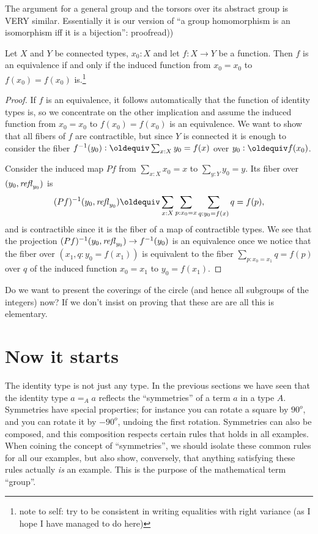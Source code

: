 \begin{definition}
The argument for a general group and the torsors over its abstract group is VERY similar.  Essentially it is our version of ``a group homomorphism is an isomorphism iff it is a bijection'': proofread))
\begin{lemma}
  Let $X$ and $Y$ be connected types, $x_0:X$ and let $f:X\to Y$ be a function.  Then $f$ is an equivalence if and only if the induced function from $x_0=x_0$ to $f(x_0)=f(x_0)$ is.\footnote{note to self: try to be consistent in writing equalities with right variance (as I hope I have managed to do here)}
\end{lemma}
\begin{proof}
  If $f$ is an equivalence, it follows automatically that the function of identity types is, so we concentrate on the other implication and assume the induced function from $x_0=x_0$ to $f(x_0)=f(x_0)$ is an equivalence.  We want to show that all fibers of $f$ are contractible, but since $Y$ is connected it is enough to consider the fiber $f^{-1}(y_0)\defequi\sum_{x:X}y_0=f(x)$ over $y_0\defequi f(x_0)$.  

Consider the induced map $Pf$ from $\sum_{x:X}x_0=x$ to $\sum_{y:Y}y_0=y$.  Its fiber over $(y_0,\mathop{{\it refl}_{y_0}})$ is 
$$(Pf)^{-1}(y_0,\refl{y_0})\oldequiv\sum_{x:X}\sum_{p:x_0=x}\sum_{q:y_0=f(x)}q=f(p),$$ and is contractible since it is the fiber of a map of contractible types.  We see that the projection $(Pf)^{-1}(y_0,\mathop{{\it refl}_{y_0}})\to f^{-1}(y_0)$ is an equivalence once we notice that the fiber over $(x_1,q:y_0=f(x_1)) $ is equivalent to the fiber $\sum_{p:x_0=x_1}q=f(p)$ over $q$ of the induced function $x_0=x_1$ to $y_0=f(x_1)$.
\end{proof}

\begin{remark}
  Do we want to present the coverings of the circle (and hence all subgroups of the integers) now?  If we don't insist on proving that these are are all this is elementary.
\end{remark}




\section{Now it starts}
The identity type is not just any type.  In the previous sections we have seen that the identity type $a=_Aa$ reflects the ``symmetries'' of a term $a$ in a type $A$.  Symmetries have special properties; for instance you can rotate a square by $90^o$, and you can rotate it by $-90^o$, undoing the first rotation.
Symmetries can also be composed, and this composition respects certain rules that holds in all examples.  When coining the concept of ``symmetries'', we should isolate these common rules for all our examples, but also show, conversely, that anything satisfying these rules actually \emph{is} an example.  This is the purpose of the mathematical term ``group''.


\end{definition}
